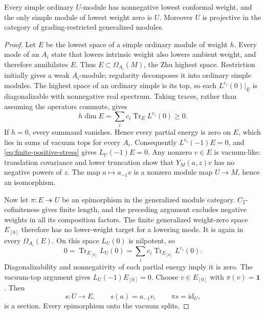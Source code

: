 \begin{lemma}
Every simple ordinary $U$-module has nonnegative lowest conformal weight,
and the only simple module of lowest weight zero is $U$. Moreover $U$
is projective in the category of grading-restricted generalized modules.
\end{lemma}
\begin{proof}
Let $E$ be the lowest space of a simple ordinary module of weight $h$.
Every mode of an $A_i$ state that lowers intrinsic weight also lowers
ambient weight, and therefore annihilates $E$. Thus
$E\subset\Omega_{A_i}(M)$, the Zhu highest space. Restriction initially
gives a weak $A_i$-module; regularity decomposes it into ordinary simple
modules. The highest space of an ordinary simple is its top, so each
$L^{e_i}(0)|_E$ is diagonalizable with nonnegative real spectrum.
Taking traces, rather than assuming the operators commute, gives
\begin{equation}
 h\dim E=\sum_i c_i\operatorname{Tr}_E L^{e_i}(0)\ge0.
 \label{eq:top-trace}
\end{equation}
If $h=0$, every summand vanishes. Hence every partial energy is zero
on $E$, which lies in sums of vacuum tops for every $A_i$. Consequently
$L^{e_i}(-1)E=0$, and \eqref{eq:finite-positive-stress} gives
$L_U(-1)E=0$. Any nonzero $v\in E$ is vacuum-like: translation covariance
and lower truncation show that $Y_M(a,z)v$ has no negative powers of $z$.
The map $a\mapsto a_{-1}v$ is a nonzero module map $U\to M$, hence an
isomorphism.

Now let $\pi:E\twoheadrightarrow U$ be an epimorphism in the generalized
module category. $C_2$-cofiniteness gives finite length, and the preceding
argument excludes negative weights in all its composition factors.
The finite generalized weight-zero space $E_{[0]}$ therefore has no
lower-weight target for a lowering mode. It is again in every
$\Omega_{A_i}(E)$. On this space $L_U(0)$ is nilpotent, so
\[
 0=\operatorname{Tr}_{E_{[0]}}L_U(0)
  =\sum_i c_i\operatorname{Tr}_{E_{[0]}}L^{e_i}(0).
\]
Diagonalizability and nonnegativity of each partial energy imply it is
zero. The vacuum-top argument gives $L_U(-1)E_{[0]}=0$. Choose
$v\in E_{[0]}$ with $\pi(v)=\mathbf1$. Then
\[
 s:U\longrightarrow E,\qquad s(a)=a_{-1}v,
 \qquad \pi s=\mathrm{id}_U,
\]
is a section. Every epimorphism onto the vacuum splits.
\end{proof}

